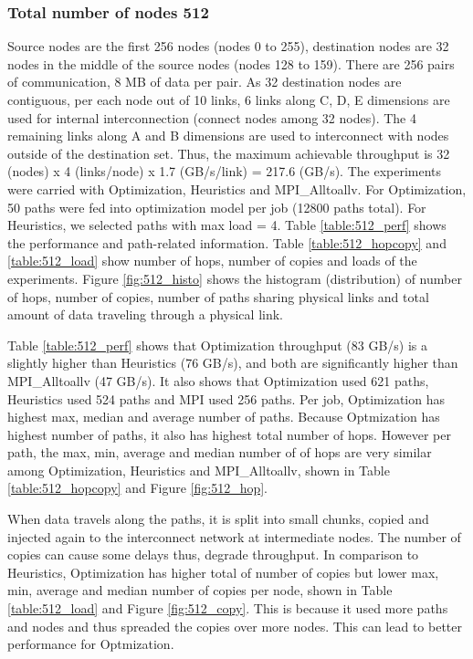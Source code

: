 \documentclass[letter]{article}
\begin{document}
\subsubsection {Total number of nodes 512}

Source nodes are the first 256 nodes (nodes 0 to 255), destination nodes are 32 nodes in the middle of the source nodes (nodes 128 to 159). There are 256 pairs of communication, 8 MB of data per pair. As 32 destination nodes are contiguous, per each node out of 10 links, 6 links along C, D, E dimensions are used for internal interconnection (connect nodes among 32 nodes). The 4 remaining links along A and B dimensions are used to interconnect with nodes outside of the destination set. Thus, the maximum achievable throughput is 32 (nodes) x 4 (links/node) x 1.7 (GB/s/link) = 217.6 (GB/s). The experiments were carried with Optimization, Heuristics and MPI\_Alltoallv. For Optimization, 50 paths were fed into optimization model per job (12800 paths total). For Heuristics, we selected paths with max load = 4. Table \ref{table:512_perf} shows the performance and path-related information. Table \ref{table:512_hopcopy} and \ref{table:512_load} show number of hops, number of copies and loads of the experiments. Figure \ref{fig:512_histo} shows the histogram (distribution) of number of hops, number of copies, number of paths sharing physical links and total amount of data traveling through a physical link.

Table \ref{table:512_perf} shows that Optimization throughput (83 GB/s) is a slightly higher than Heuristics (76 GB/s), and both are significantly higher than MPI\_Alltoallv (47 GB/s). It also shows that Optimization used 621 paths, Heuristics used 524 paths and MPI used 256 paths. Per job, Optimization has highest max, median and average number of paths. Because Optmization has highest number of paths, it also has highest total number of hops. However per path, the max, min, average and median number of of hops are very similar among Optimization, Heuristics and MPI\_Alltoallv, shown in Table \ref{table:512_hopcopy} and Figure \ref{fig:512_hop}. 

When data travels along the paths, it is split into small chunks, copied and injected again to the interconnect network at intermediate nodes. The number of copies can cause some delays thus, degrade throughput. In comparison to Heuristics, Optimization has higher total of number of copies but lower max, min, average and median number of copies per node, shown in Table \ref{table:512_load} and Figure \ref{fig:512_copy}. This is because it used more paths and nodes and thus spreaded the copies over more nodes. This can lead to better performance for Optmization.
\end{document}
